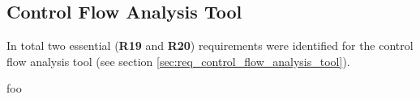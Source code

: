 
\subsection{Control Flow Analysis Tool}

In total two essential (\textbf{R19} and \textbf{R20}) requirements were identified for the control flow analysis tool (see section \ref{sec:req_control_flow_analysis_tool}).

foo
